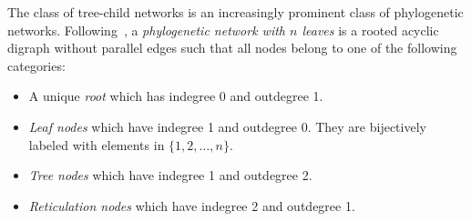 \documentclass[reqno, 12pt]{article}
\theoremstyle{mydefinition}
\theoremstyle{myremark}
\numberwithin{algorithm}{section}
\begin{document}
The class of tree-child networks is an increasingly prominent class of phylogenetic networks.
Following~\cite{PB}, a {\em phylogenetic network with $n$ leaves} is a rooted acyclic digraph without parallel edges such that all nodes belong to one of the following categories:
\begin{itemize}
\item[(1)] A unique {\em root} which has indegree 0 and outdegree 1.
\item[(2)] {\em Leaf nodes} which have indegree 1 and outdegree 0. They are bijectively labeled with elements in  $\{1,2,\ldots,n\}$.
\item[(3)] {\em Tree nodes} which have indegree 1 and outdegree 2.
\item[(4)] {\em Reticulation nodes} which have indegree 2 and outdegree 1.
\end{itemize}
\end{document}
